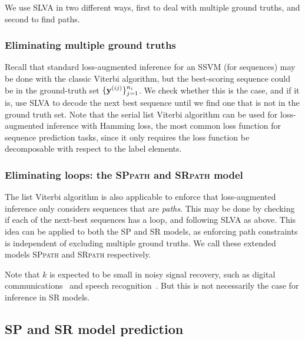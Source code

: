 We use SLVA in two different ways, first to deal with multiple ground truths, and second to find paths.


\subsubsection{Eliminating multiple ground truths}
Recall that standard loss-augmented inference for an SSVM (for sequences) may be done with the classic Viterbi algorithm, but the best-scoring sequence could be in the ground-truth set $\{\mathbf{y}^{(ij)}\}_{j=1}^{n_i}$. We check whether this is the case, and if it is, use SLVA to decode the next best sequence until we find one that is not in the ground truth set.
Note that the serial list Viterbi algorithm
can be used for loss-augmented inference with Hamming loss, the most common loss function for sequence prediction tasks,
since it only requires the loss function be decomposable with respect to the label elements.


\subsubsection{Eliminating loops: the \textsc{SPpath} and \textsc{SRpath} model}
The list Viterbi algorithm is also applicable to enforce that loss-augmented inference only considers sequences that are \emph{paths}. This may be done by checking if each of the next-best sequences has a loop, and following SLVA as above.
This idea can be applied to both the SP and SR models, as enforcing path constraints is independent of excluding multiple ground truths.
We call these extended models \textsc{SPpath} and \textsc{SRpath} respectively.

Note that $k$ is expected to be small in noisy signal recovery, such as digital communications~\cite{seshadri1994list} and speech recognition~\cite{soong1991tree}. But this is not necessarily the case for inference in SR models.

\subsection{SP and SR model prediction}
\label{ssec:testing}

